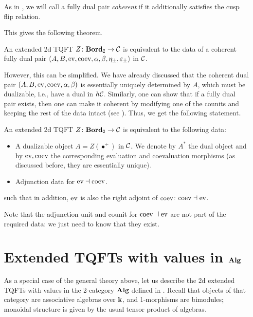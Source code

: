 As in \cite{pstragowski}, we will call a fully dual pair \emph{coherent}
if it additionally satisfies the cusp flip relation.

This gives the following theorem.

\begin{theorem}\label{t:2d-etqft-classification1}
  An extended 2d TQFT $Z\colon \mathbf{Bord}_2\to \mathcal{C}$ is equivalent to the
  data of a coherent fully dual pair
  $(A, B, \operatorname{ev}, \operatorname{coev}, \alpha, \beta, \eta_\pm, \varepsilon_\pm)$ in $\mathcal{C}$.
\end{theorem}

However, this can be simplified. We have already discussed that the
coherent dual pair $(A, B, \operatorname{ev}, \operatorname{coev}, \alpha, \beta)$ is essentially
uniquely determined by $A$, which must be dualizable, i.e., have a
dual in $h\mathcal{C}$. Similarly, one can show that if a fully dual pair exists,
then one can make it coherent by modifying one of the counits and keeping
the rest of the data intact (see \cite[Theorem 3.16]{pstragowski}). Thus, we
get the following statement.

\begin{theorem}\label{t:2d-etqft-classification2}
  An extended 2d TQFT $Z\colon \mathbf{Bord}_2\to \mathcal{C}$ is equivalent to the
  following data:
  \begin{itemize}
    \item A dualizable object $A=Z(\bullet^+)$ in $\mathcal{C}$. We denote by
    $A^*$ the dual object and by $\operatorname{ev}, \operatorname{coev}$ the corresponding evaluation
    and coevaluation morphisms
    \textup{(}as discussed before, they are essentially unique\textup{)}.
    \item Adjunction data for $\operatorname{ev}\dashv \operatorname{coev}$.
  \end{itemize}
  such that in addition, $\operatorname{ev}$ is also the right adjoint of $\operatorname{coev}$:
   $\operatorname{coev} \dashv \operatorname{ev}$.
\end{theorem}

Note that the adjunction unit and counit for $\operatorname{coev} \dashv \operatorname{ev}$ are not
part of the required data: we just need to know that they exist.


\section{Extended TQFTs with values in $\mathbf{Alg}$}\label{s:extended-alg}

As a special case of the general theory above, let us describe the 2d
extended TQFTs with values in the 2-category $\mathbf{Alg}$ defined in
. Recall that objects of that category are associative
algebras over $\mathbf{k}$, and 1-morphisms are bimodules; monoidal structure is
given by the usual tensor product of algebras.


